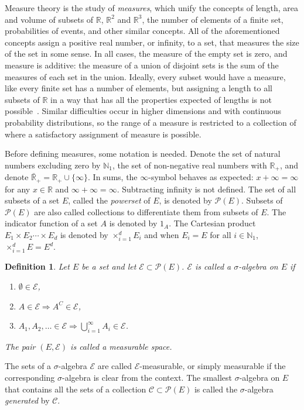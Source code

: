 \documentclass[english,twoside,openright]{HYgraduMLDS}
\newtheorem{definition}[lemma]{Definition}
\newcommand{\R}{\mathbb{R}}
\newcommand{\N}{\mathbb{N}}
\DeclareMathOperator*{\bigtimes}{\times}
\begin{document}
Measure theory is the study of \emph{measures}, which unify the concepts
of length, area and volume of subsets of \(\R\), \(\R^{2}\) and
\(\R^{3}\), the number of elements of a finite set, probabilities of events,
and other similar
concepts. All of the aforementioned concepts assign a positive real number,
or infinity, to a set, that measures the size of the set in some sense.
In all cases, the measure of the empty set is zero, and measure is
additive: the measure of a union of disjoint sets is the sum of the measures
of each set in the union. Ideally, every subset would have a measure, like
every finite set has a number of elements, but assigning a
length to all subsets of \(\R\) in a way that has all the properties expected
of lengths
is not possible~\cite{Cin11}. Similar difficulties occur in higher dimensions and with
continuous probability distributions, so the range of a measure is
restricted to a collection of where a satisfactory assignment of measure is
possible.

Before defining measures, some notation is needed. Denote the set of
natural numbers excluding zero by \(\N_{1}\), the set of
non-negative real numbers with \(\R_{+}\), and denote
\(\bar{\R}_{+} = \R_{+}\cup \{\infty\}\). In sums, the \(\infty\)-symbol
behaves as expected: \(x + \infty = \infty\) for any \(x\in \R\) and
\(\infty + \infty = \infty\). Subtracting infinity is not defined.
The set of all subsets of a set \(E\), called
the \emph{powerset} of \(E\), is denoted by \(\mathcal{P}(E)\).
Subsets of \(\mathcal{P}(E)\) are also called collections to
differentiate them from subsets of \(E\).
The indicator function of a set \(A\) is denoted by \(1_{A}\).
The Cartesian product \(E_{1}\times E_{2}\dotsb \times E_{d}\)
is denoted by \(\bigtimes_{i=1}^{d}E_{i}\) and when \(E_{i} = E\) for
all \(i\in \N_{1}\), \(\bigtimes_{i=1}^{d}E = E^{d}\).

\begin{definition}
  Let \(E\) be a set and let \(\mathcal{E}\subset \mathcal{P}(E)\).
  \(\mathcal{E}\) is called a \(\sigma\)-algebra on \(E\) if
  \begin{enumerate}
    \item \(\emptyset \in \mathcal{E}\),
    \item \(A\in \mathcal{E}\Rightarrow A^{C}\in \mathcal{E}\),
    \item \(A_{1},A_{2},\dotsc \in \mathcal{E}
          \Rightarrow \bigcup_{i=1}^{\infty} A_{i}\in \mathcal{E}\).
  \end{enumerate}
  The pair \((E, \mathcal{E})\) is called a measurable space.
\end{definition}
The sets of a \(\sigma\)-algebra \(\mathcal{E}\) are called
\(\mathcal{E}\)-measurable, or simply measurable if the corresponding
\(\sigma\)-algebra is clear from the context. The smallest \(\sigma\)-algebra
on \(E\) that contains all the sets of a collection
\(\mathcal{C}\subset \mathcal{P}(E)\) is called the \(\sigma\)-algebra
\emph{generated} by \(\mathcal{C}\).
\end{document}

